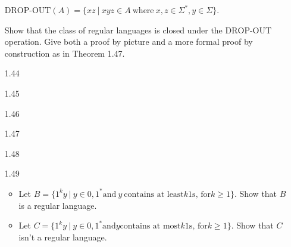 \begin{enumerate}
          $\text{DROP-OUT}(A)=\{xz ~|~ xyz \in A~ \text{where}~ x,z \in \Sigma^\ast,y \in \Sigma\}$.

          Show that the class of regular languages is closed under the $\text{DROP-OUT}$ operation. Give both a proof by picture and a more formal proof by construction as in Theorem 1.47.

    \item [1.44]
    \item [1.45]
    \item [1.46]
    \item [1.47]
    \item [1.48]
    \item [1.49]

    \begin{itemize}
      \item Let $B =\{1^ky~|~ y \in{0,1}^\ast \text{and} ~y~ \text{contains at least} k 1\text{s, for} k \ge 1\}$. Show that $B$ is a regular language. 
      \item Let $C =\{1^ky~|~y \in{0,1}^\ast \text{and} y \text{contains at most} k 1 \text{s, for} k \ge 1\}$. Show that $C$ isn’t a regular language.
    \end{itemize}

\end{enumerate}
